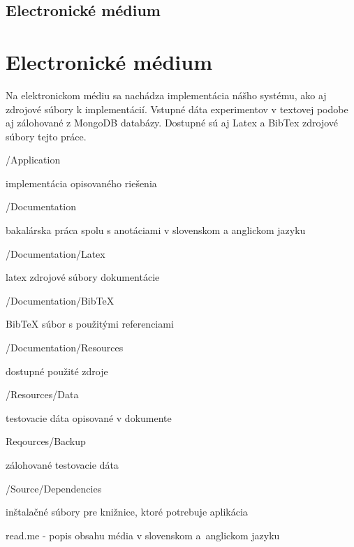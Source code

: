 \newpage
{}
{
	\section{Electronické médium}
}
{
	\chapter{Electronické médium}
}
Na elektronickom médiu sa nachádza implementácia nášho systému, ako aj zdrojové súbory k implementácií. Vstupné dáta experimentov v textovej podobe aj zálohované z MongoDB databázy. Dostupné sú aj Latex a BibTex zdrojové súbory tejto práce.
\begin{my_itemize}
\emptyitem /Application
	\begin{my_itemize}
	\myitem implementácia opisovaného riešenia
	\end{my_itemize}	
\emptyitem /Documentation
	\begin{my_itemize}
	\myitem bakalárska práca spolu s anotáciami v slovenskom a anglickom jazyku
	\end{my_itemize}
\emptyitem /Documentation/Latex
	\begin{my_itemize}
	\myitem latex zdrojové súbory dokumentácie
	\end{my_itemize}
\emptyitem /Documentation/BibTeX
	\begin{my_itemize}
	\myitem BibTeX súbor s použitými referenciami
	\end{my_itemize}
\emptyitem /Documentation/Resources
	\begin{my_itemize}
	\myitem dostupné použité zdroje
	\end{my_itemize}
\emptyitem /Resources/Data
	\begin{my_itemize}
		\myitem testovacie dáta opisované v dokumente
	\end{my_itemize}
\emptyitem Reqources/Backup
	\begin{my_itemize}
		\myitem zálohované testovacie dáta
	\end{my_itemize}
\emptyitem /Source/Dependencies
	\begin{my_itemize}
	\myitem inštalačné súbory pre knižnice, ktoré potrebuje aplikácia
	\end{my_itemize}	
\emptyitem read.me	- popis obsahu média v slovenskom a~anglickom jazyku
\end{my_itemize}

